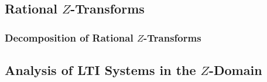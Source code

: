 \subsection{Rational $Z$-Transforms}\label{subsec:Rational Z-Transforms}
\subsubsection{Decomposition of Rational $Z$-Transforms}\label{subsubsec:Decompose Rational Z-Transforms}

\subsection{Analysis of LTI Systems in the $Z$-Domain}\label{subsec:Analysis LTI Systems Z-Domain}

